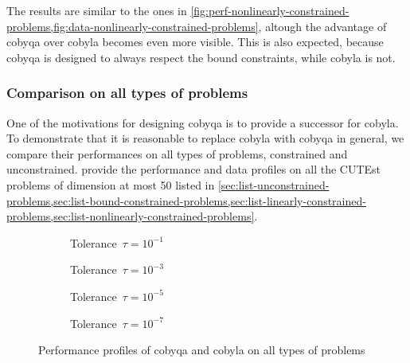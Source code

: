 The results are similar to the ones in \cref{fig:perf-nonlinearly-constrained-problems,fig:data-nonlinearly-constrained-problems}, altough the advantage of \gls{cobyqa} over \gls{cobyla} becomes even more visible.
This is also expected, because \gls{cobyqa} is designed to always respect the bound constraints, while \gls{cobyla} is not.

\subsubsection{Comparison on all types of problems}

One of the motivations for designing \gls{cobyqa} is to provide a successor for \gls{cobyla}.
To demonstrate that it is reasonable to replace \gls{cobyla} with \gls{cobyqa} in general, we compare their performances on all types of problems, constrained and unconstrained.
 provide the performance and data profiles on all the CUTEst problems of dimension at most \num{50} listed in \cref{sec:list-unconstrained-problems,sec:list-bound-constrained-problems,sec:list-linearly-constrained-problems,sec:list-nonlinearly-constrained-problems}.

\begin{figure}[ht]
    \centering
    \begin{subfigure}[b]{0.49\textwidth}
        \centering
        \caption{Tolerance~$\tau = 10^{-1}$}
    \end{subfigure}
    \hfill
    \begin{subfigure}[b]{0.49\textwidth}
        \centering
        \caption{Tolerance~$\tau = 10^{-3}$}
    \end{subfigure}
    \begin{subfigure}[b]{0.49\textwidth}
        \centering
        \caption{Tolerance~$\tau = 10^{-5}$}
    \end{subfigure}
    \hfill
    \begin{subfigure}[b]{0.49\textwidth}
        \centering
        \caption{Tolerance~$\tau = 10^{-7}$}
    \end{subfigure}
    \caption[Performance profiles on all problems]{Performance profiles of \gls{cobyqa} and \gls{cobyla} on all types of problems}
    \label{fig:perf-all-problems}
\end{figure}


